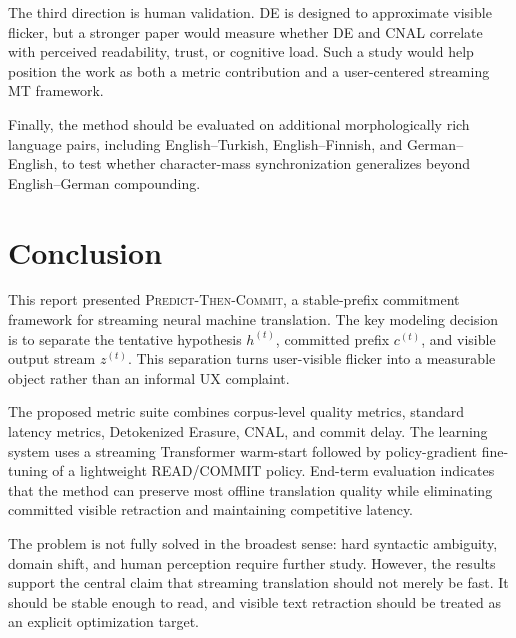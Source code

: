 \documentclass[conference]{IEEEtran}
\begin{document}
The third direction is human validation. DE is designed to approximate visible flicker, but a stronger paper would measure whether DE and CNAL correlate with perceived readability, trust, or cognitive load. Such a study would help position the work as both a metric contribution and a user-centered streaming MT framework.

Finally, the method should be evaluated on additional morphologically rich language pairs, including English--Turkish, English--Finnish, and German--English, to test whether character-mass synchronization generalizes beyond English--German compounding.

\section{Conclusion}
This report presented \textsc{Predict-Then-Commit}, a stable-prefix commitment framework for streaming neural machine translation. The key modeling decision is to separate the tentative hypothesis $h^{(t)}$, committed prefix $c^{(t)}$, and visible output stream $z^{(t)}$. This separation turns user-visible flicker into a measurable object rather than an informal UX complaint.

The proposed metric suite combines corpus-level quality metrics, standard latency metrics, Detokenized Erasure, CNAL, and commit delay. The learning system uses a streaming Transformer warm-start followed by policy-gradient fine-tuning of a lightweight READ/COMMIT policy. End-term evaluation indicates that the method can preserve most offline translation quality while eliminating committed visible retraction and maintaining competitive latency.

The problem is not fully solved in the broadest sense: hard syntactic ambiguity, domain shift, and human perception require further study. However, the results support the central claim that streaming translation should not merely be fast. It should be stable enough to read, and visible text retraction should be treated as an explicit optimization target.
\end{document}
